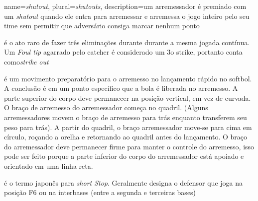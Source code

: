 {
	name={\textit{shutout}},
	plural={\textit{shutouts}},
	description={um arremessador é premiado com um \textit{shutout} quando ele entra para arremessar e arremessa o jogo inteiro pelo seu time sem permitir que adversário consiga marcar nenhum ponto}
}

 	{ é o ato raro de fazer três eliminações durante durante a mesma jogada contínua. Um \textit{Foul tip} agarrado pelo catcher é considerado um 3o strike, portanto conta como\textit{strike out}}
 
{ é um movimento preparatório para o arremesso no lançamento rápido no softbol. A conclusão é em um ponto específico que a bola é liberada no arremesso. A parte superior do corpo deve permanecer na posição vertical, em vez de curvada. O braço de arremesso do arremessador começa no quadril. (Alguns arremessadores movem o braço de arremesso para trás enquanto transferem seu peso para trás). A partir do quadril, o braço arremessador move-se para cima em círculo, roçando a orelha e retornando ao quadril antes do lançamento. O braço do arremessador deve permanecer firme para manter o controle do arremesso, isso pode ser feito porque a parte inferior do corpo do arremessador está apoiado e orientado em uma linha reta.}

	{ é o termo japonês para \textit{short Stop}. Geralmente designa o defensor que joga na posição F6 ou na interbases (entre a segunda e terceiras bases)}





